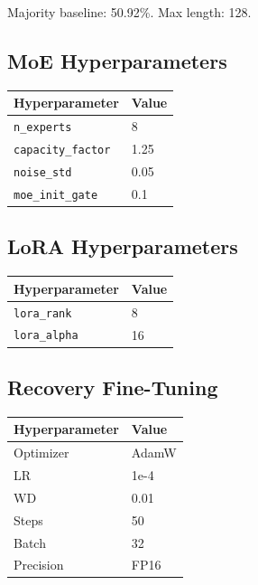 Majority baseline: 50.92\%. Max length: 128.

\subsection{MoE Hyperparameters}

\begin{table}[H]
\centering
\small
\begin{tabular}{ll}
\toprule
\textbf{Hyperparameter} & \textbf{Value} \\
\midrule
\texttt{n\_experts} & 8 \\
\texttt{capacity\_factor} & 1.25 \\
\texttt{noise\_std} & 0.05 \\
\texttt{moe\_init\_gate} & 0.1 \\
\bottomrule
\end{tabular}
\end{table}

\subsection{LoRA Hyperparameters}

\begin{table}[H]
\centering
\small
\begin{tabular}{ll}
\toprule
\textbf{Hyperparameter} & \textbf{Value} \\
\midrule
\texttt{lora\_rank} & 8 \\
\texttt{lora\_alpha} & 16 \\
\bottomrule
\end{tabular}
\end{table}

\subsection{Recovery Fine-Tuning}

\begin{table}[H]
\centering
\small
\begin{tabular}{ll}
\toprule
\textbf{Hyperparameter} & \textbf{Value} \\
\midrule
Optimizer & AdamW \\
LR & 1e-4 \\
WD & 0.01 \\
Steps & 50 \\
Batch & 32 \\
Precision & FP16 \\
\bottomrule
\end{tabular}
\end{table}

